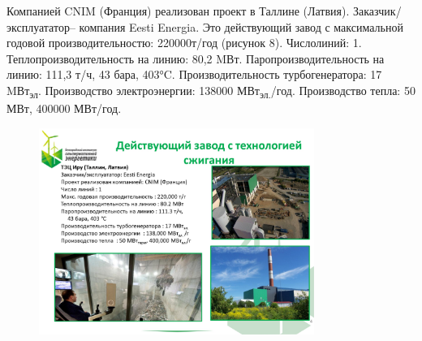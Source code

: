 Компанией CNIM (Франция) реализован проект в Таллине (Латвия).
Заказчик/эксплуататор-- компания Eesti Energia. Это действующий завод с
максимальной годовой производительностю: 220000т/год (рисунок 8).
Числолиний: 1. Теплопроизводительность на линию: 80,2 MВт.
Паропроизводительность на линию: 111,3 т/ч, 43 бара, 403°C.
Производительность турбогенератора: 17 MВт\textsubscript{эл}.
Производство электроэнергии: 138000 МВт\textsubscript{эл.}/год.
Производство тепла: 50 МВт, 400000 МВт/год.

\begin{figure}[H]
	\centering
	\includegraphics[width=0.8\textwidth]{media/chem2/image71}
	\caption*{}
\end{figure}

